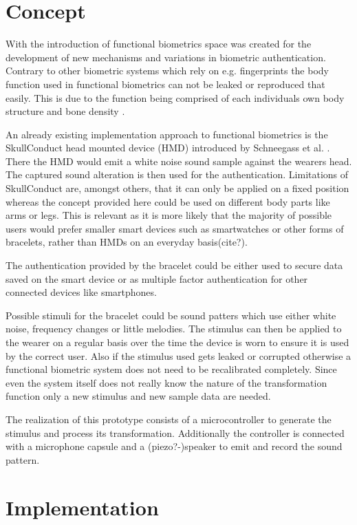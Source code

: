 \section{Concept}
With the introduction of functional biometrics space was created for the development of new mechanisms and variations in biometric authentication.
Contrary to other biometric systems which rely on e.g. fingerprints the body function used in functional biometrics can not be leaked or reproduced that easily.
This is due to the function being comprised of each individuals own body structure and bone density \cite{schneegass2020functbiometric}.

An already existing implementation approach to functional biometrics is the SkullConduct head mounted device (HMD) introduced by Schneegass et al. \cite{SkullConduct}.
There the HMD would emit a white noise sound sample against the wearers head.
The captured sound alteration is then used for the authentication.
Limitations of SkullConduct are, amongst others, that it can only be applied on a fixed position whereas the concept provided here could be used on different body parts like arms or legs.
This is relevant as it is more likely that the majority of possible users would prefer smaller smart devices such as smartwatches or other forms of bracelets, rather than HMDs on an everyday basis(cite?).
 
The authentication provided by the bracelet could be either used to secure data saved on the smart device or as multiple factor authentication for other connected devices like smartphones.

Possible stimuli for the bracelet could be sound patters which use either white noise, frequency changes or little melodies.
The stimulus can then be applied to the wearer on a regular basis over the time the device is worn to ensure it is used by the correct user.
Also if the stimulus used gets leaked or corrupted otherwise a functional biometric system does not need to be recalibrated completely.
Since even the system itself does not really know the nature of the transformation function only a new stimulus and new sample data are needed.

The realization of this prototype consists of a microcontroller to generate the stimulus and process its transformation.
Additionally the controller is connected with a microphone capsule and a (piezo?-)speaker to emit and record the sound pattern.
 
\section{Implementation}
